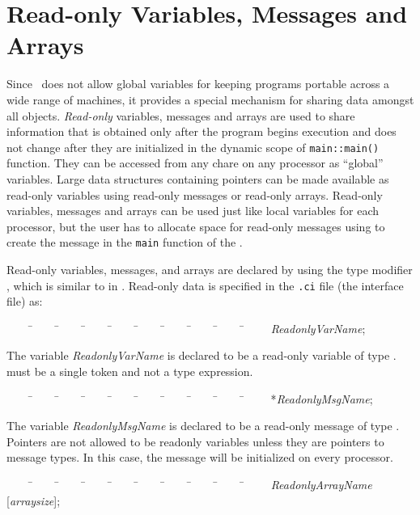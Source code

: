 \section{Read-only Variables, Messages and Arrays}

Since \charmpp\ does not allow global variables for keeping
programs portable across a wide range of machines, it provides a special
mechanism for sharing data amongst all objects. {\it Read-only}
variables, messages and arrays are used to share information that 
is obtained only after the program begins execution and does not
change after they are initialized in the dynamic scope of 
{\tt main::main()} function. They
can be accessed from any chare on any processor as ``global''
variables. Large data structures containing pointers can be made
available as read-only variables using read-only messages or
read-only arrays. Read-only variables, messages and arrays can
be used just like local variables for each processor, but the user has
to allocate space for read-only messages using  to create
the message in the {\tt main} function of the . 

Read-only variables, messages, and arrays are declared by using the type
modifier , which is similar to  in
\CC. Read-only data is specified in the {\tt .ci} file (the interface
file) as: 

\begin{tabbing}
~~~~ \=~~~~ \=~~~~ \=~~~~ \=~~~~ \=~~~~ \=~~~~ \=~~~~ \=~~~~ \=~~~~ \kill
\>   {\it ReadonlyVarName};
\end{tabbing}

The variable {\it ReadonlyVarName} is declared to be a read-only
variable of type .  must be a single token and not a
type expression.

\begin{tabbing}
~~~~ \=~~~~ \=~~~~ \=~~~~ \=~~~~ \=~~~~ \=~~~~ \=~~~~ \=~~~~ \=~~~~ \kill
\>   *{\it ReadonlyMsgName};
\end{tabbing}

The variable {\it ReadonlyMsgName} is declared to be a read-only
message of type . Pointers are not allowed to be
readonly variables unless they are pointers to message types. In this
case, the message will be initialized on every processor.

\begin{tabbing}
~~~~ \=~~~~ \=~~~~ \=~~~~ \=~~~~ \=~~~~ \=~~~~ \=~~~~ \=~~~~ \=~~~~ \kill
\>   {\it ReadonlyArrayName} [{\it arraysize}];
\end{tabbing}

